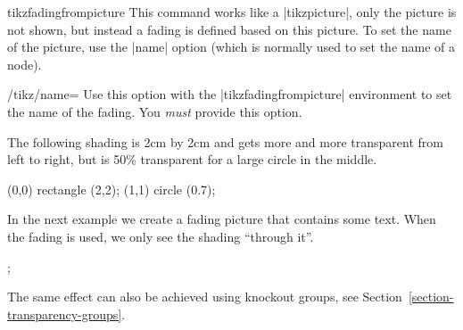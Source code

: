 \begin{environment}{{tikzfadingfrompicture}}
    This command works like a |{tikzpicture}|, only the picture is not shown,
    but instead a fading is defined based on this picture. To set the name of
    the picture, use the |name| option (which is normally used to set the name
    of a node).
    \begin{key}{/tikz/name=}
        Use this option with the |{tikzfadingfrompicture}| environment to set
        the name of the fading. You \emph{must} provide this option.
    \end{key}

    The following shading is 2cm by 2cm and gets more and more transparent from
    left to right, but is 50\% transparent for a large circle in the middle.
{\tikzexternaldisable
\begin{codeexample}[]
\begin{tikzfadingfrompicture}[name=fade right]
  \shade[left color=transparent!0,
         right color=transparent!100] (0,0) rectangle (2,2);
  \fill[transparent!50] (1,1) circle (0.7);
\end{tikzfadingfrompicture}

\end{codeexample}
    In the next example we create a fading picture that contains some text.
    When the fading is used, we only see the shading ``through it''.
\begin{codeexample}[]
\begin{tikzfadingfrompicture}[name=tikz]
  ;
\end{tikzfadingfrompicture}

\end{codeexample}
}%

    The same effect can also be achieved using knockout groups, see
    Section~\ref{section-transparency-groups}.
\end{environment}

